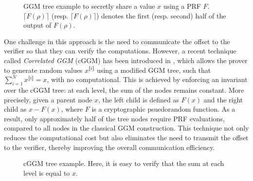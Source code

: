 \documentclass[english]{article}
\newcommand{\lir}{\llbracket i \rrbracket}
\begin{document}
		\begin{figure}[H]
			\begin{center}
				\caption{GGM tree example to secretly share a value $x$ using a PRF $F$. $\lceil F(\rho)\rceil$ (resp. $\lceil F(\rho)\rceil$) denotes the first (resp. second) half of the output of $F(\rho)$.}
				\label{fig:GGMtree}
			\end{center}
		\end{figure}
		
		One challenge in this approach is the need to communicate the offset to the verifier so that they can verify the computations. However, a recent technique called \emph{Correlated GGM} (cGGM) has been introduced in \cite{GYWZ+22}, which allows the prover to generate random values $x^{\lir}$ using a modified GGM tree, such that $\sum_{i=1}^{N} x^{\lir} = x$, with no computational.
		This is achieved by enforcing an invariant over the cGGM tree: at each level, the sum of the nodes remains constant. More precisely, given a parent node $x$, the left child is defined as $F(x)$ and the right child as $x - F(x)$, where $F$ is a cryptographic psuedorandom function. As a result, only approximately half of the tree nodes require PRF evaluations, compared to all nodes in the classical GGM construction.
		This technique not only reduces the computational cost but also eliminates the need to transmit the offset to the verifier, thereby improving the overall communication efficiency.
		
		\begin{figure}[H]
		\begin{center}
			\caption{cGGM tree example. Here, it is easy to verify that the sum at each level is equal to $x$.}
			\label{fig:cGGMtree}
		\end{center}
		\end{figure}
		
\end{document}
